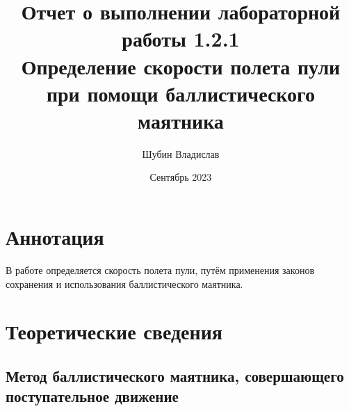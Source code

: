 \documentclass[a4paper, 12pt]{article}
\title{Отчет о выполнении лабораторной работы 1.2.1\\Определение скорости полета пули при помощи баллистического маятника}
\author{Шубин Владислав}
\date{Сентябрь 2023}
\begin{document}
    
	
	\maketitle
	
	\section{Аннотация}
	В работе определяется скорость полета пули, путём применения законов сохранения и использования баллистического маятника.
	
	
	\section{Теоретические сведения}
	
	\subsection{Метод баллистического маятника, совершающего поступательное движение}
	
\end{document}
